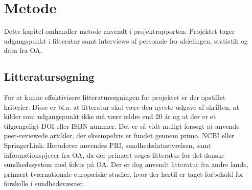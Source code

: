 \chapter{Metode}

Dette kapitel omhandler metode anvendt i projektrapporten. Projektet tager udgangspunkt i litteratur samt interviews af personale fra afdelingen, statistik og data fra OA. 


\section{Litteratursøgning}
For at kunne effektivisere litteratursøgningen for projektet er der opstillet kriterier. Disse er bl.a. at litteratur skal være den nyeste udgave af skriften, at kilder som udgangspunkt ikke må være ældre end $20$ år og at der er et tilgængeligt DOI eller ISBN nummer. 
Det er så vidt muligt forsøgt at anvende peer-reviewede artikler, der eksempelvis er fundet gennem primo, NCBI eller SpringerLink. Herudover anvendes PRI, sundhedsdatastyrelsen, samt informationspjecer fra OA, da der primært søges litteratur for det danske sundhedssystem med fokus på OA. Der er dog anvendt litteratur fra andre lande, primært tværnationale europæiske studier, hvor der hertil er taget forbehold for forskelle i sundhedsvæsner.


